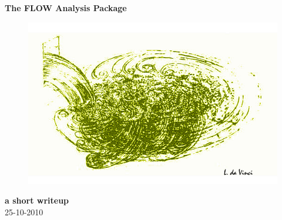\thispagestyle{empty}
\noindent
\begin{center}
{\LARGE \bf The FLOW Analysis Package}\\

\vspace{1.5cm}

\begin{figure}[hbt]
    \includegraphics[width=1.\textwidth]{figs/daVinci.png}
\end{figure}

\vspace{1.5cm}
\noindent
{\large \bf a short writeup}\\
25-10-2010\\
\end{center}

\clearpage
\thispagestyle{empty}
